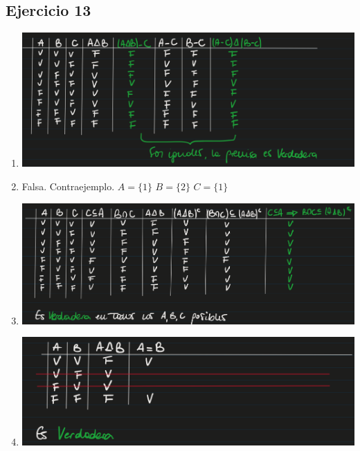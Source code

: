 \subsection{Ejercicio 13}
\begin{enumerate}[label=(\alph*)]
    \item \includegraphics[width=500px]{1.13.1}
    \item Falsa. Contraejemplo. $A=\{1\}$ $B=\{2\}$ $C=\{1\}$ 
    \item \includegraphics[width=500px]{1.13.3}
    \item \includegraphics[width=500px]{1.13.4}
\end{enumerate}


